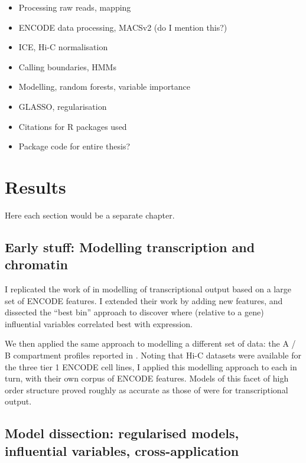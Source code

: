 \documentclass[a4paper,10pt,oneside]{book}
\begin{document}
\begin{itemize}
\itemsep1pt\parskip0pt
\item
  Processing raw reads, mapping
\item
  ENCODE data processing, MACSv2 (do I mention this?)
\item
  ICE, Hi-C normalisation
\item
  Calling boundaries, HMMs
\item
  Modelling, random forests, variable importance
\item
  GLASSO, regularisation
\item
  Citations for R packages used
\item
  Package code for entire thesis?
\end{itemize}

\chapter{Results}

Here each section would be a separate chapter.

\section{\textbf{Early stuff:} Modelling transcription and
chromatin}\label{early-stuff-modelling-transcription-and-chromatin}

I replicated the work of \citet{Dong2012} in modelling of
transcriptional output based on a large set of ENCODE features. I
extended their work by adding new features, and dissected the ``best
bin'' approach to discover where (relative to a gene) influential
variables correlated best with expression.

We then applied the same approach to modelling a different set of data:
the A / B compartment profiles reported in \citet{Lieberman2011}. Noting
that Hi-C datasets were available for the three tier 1 ENCODE cell
lines, I applied this modelling approach to each in turn, with their own
corpus of ENCODE features. Models of this facet of high order structure
proved roughly as accurate as those of \citet{Dong2012} were for
transcriptional output.

\section{\textbf{Model dissection}: regularised models, influential
variables,
cross-application}\label{model-dissection-regularised-models-influential-variables-cross-application}
\end{document}
